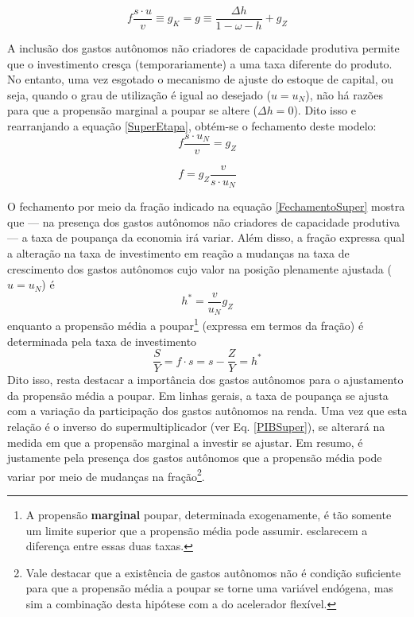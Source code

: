 \begin{equation}
\label{SuperEtapa}
f\frac{s\cdot u}{v} \equiv g_K = g \equiv \frac{\Delta h}{1 - \omega - h} +  g_Z
\end{equation}


A inclusão dos gastos autônomos não criadores de capacidade produtiva permite que o investimento cresça (temporariamente) a uma taxa diferente do produto.
No entanto, uma vez esgotado o mecanismo de ajuste do estoque de capital, ou seja, quando o grau de utilização é igual ao desejado ($u = u_N$), não há razões para que a propensão marginal a poupar se altere ($\Delta h = 0$). 
Dito isso e rearranjando a equação \ref{SuperEtapa}, obtém-se o fechamento deste modelo:
$$
f\frac{ s\cdot  u_N}{ v} =  g_Z
$$


\begin{equation}
\label{FechamentoSuper}
f =  g_Z\frac{ v}{s\cdot  u_N}
\end{equation}

O fechamento por meio da fração indicado na equação \ref{FechamentoSuper} mostra que --- na presença dos gastos autônomos não criadores de capacidade produtiva --- a taxa de poupança da economia irá variar.
Além disso, a fração expressa qual a alteração na taxa de investimento em reação a mudanças na taxa de crescimento dos gastos autônomos cujo valor na posição plenamente ajustada ($u = u_N$) é
$$
h^* = \frac{v}{u_N}g_Z
$$
enquanto a propensão média a poupar\footnote{A propensão \textbf{marginal} poupar, determinada exogenamente, é tão somente um limite superior que a propensão média pode assumir. \textcite[p.~51--52]{serrano_o_2000} esclarecem a diferença entre essas duas taxas.} (expressa em termos da fração) é determinada pela taxa de investimento 
$$
\frac{S}{Y} = f\cdot s = s - \frac{Z}{Y} =  h^*
$$
Dito isso, resta destacar a importância dos gastos autônomos para o ajustamento da propensão média a poupar.
Em linhas gerais, a taxa de poupança se ajusta com a variação da participação dos gastos autônomos na renda.
Uma vez que esta relação é o inverso do supermultiplicador (ver Eq. \ref{PIBSuper}), se alterará na medida em que a propensão marginal a investir se ajustar.
Em resumo, é justamente pela presença dos gastos autônomos que a propensão média pode variar por meio de mudanças na fração\footnote{
	Vale destacar que a existência de gastos autônomos não é condição suficiente para que a propensão média a poupar se torne uma variável endógena, mas sim a combinação desta hipótese com a do acelerador flexível.
}.

